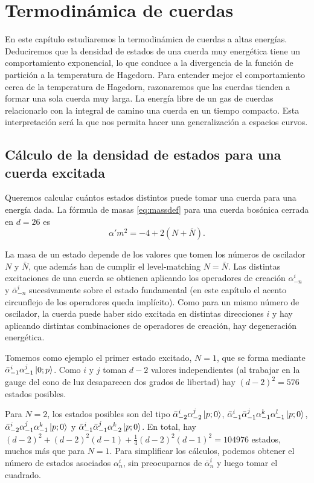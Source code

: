 \chapter{Termodinámica de cuerdas}

En este capítulo estudiaremos la termodinámica de cuerdas a altas energías.
Deduciremos que la densidad de estados de una cuerda muy energética tiene un comportamiento
exponencial, lo que conduce a la divergencia de la función de partición a la temperatura de 
Hagedorn.
Para entender mejor el comportamiento cerca de la temperatura de Hagedorn, razonaremos 
que las cuerdas tienden a formar una sola cuerda muy larga.
La energía libre de un gas de cuerdas relacionarlo con la integral de camino una cuerda
en un tiempo compacto.
Esta interpretación será la que nos permita hacer una generalización a espacios curvos.

\section{Cálculo de la densidad de estados para una cuerda excitada}

Queremos calcular cuántos estados distintos puede tomar una cuerda para una energía dada.
La fórmula de masas \ref{eq:massdef} para una cuerda bosónica cerrada en $d=26$ es 
\begin{equation}
  \alpha' m^2=-4+2(N+\bar N).
\end{equation}

La masa de un estado depende de los valores que tomen los números de oscilador $N$ y $\bar N$, que además
han de cumplir el level-matching $N=\bar N$.
Las distintas excitaciones de una cuerda se obtienen aplicando los operadores
de creación $\alpha^i_{-n}$ y $\bar \alpha^i_{-n}$ sucesivamente sobre el estado fundamental (en este
capítulo el acento circunflejo de los operadores queda implícito).
Como para un mismo número de oscilador, la cuerda puede haber sido excitada en distintas direcciones
$i$ y hay aplicando distintas combinaciones de operadores de creación, hay degeneración energética.

Tomemos como ejemplo el primer estado excitado, $N=1$, que se forma mediante $\bar \alpha^i_{-1} \alpha^j_{-1} \ket{0;p}$.
Como $i$ y $j$ toman $d-2$ valores independientes (al trabajar en la gauge del cono de luz desaparecen dos grados de libertad)
hay $(d-2)^2=576$ estados posibles.

Para $N=2$, los estados posibles son del tipo $\bar \alpha^i_{-2} \alpha^j_{-2}\ket{p;0}$, 
$\bar \alpha^i_{-1} \bar \alpha^j_{-1} \alpha^k_{-1} \alpha^l_{-1} \ket{p;0}$,
$\bar \alpha^i_{-2} \alpha^j_{-1} \alpha^k_{-1}\ket{p;0}$ y $\bar \alpha^i_{-1} \bar \alpha^j_{-1} \alpha^k_{-2} \ket{p;0}$.
En total, hay $(d-2)^2 + (d-2)^2(d-1) + \frac{1}{4}(d-2)^2(d-1)^2= 104976$ estados, muchos más que para $N=1$.
Para simplificar los cálculos, podemos obtener el número de estados asociados $\alpha^i_n$,
sin preocuparnos de $\bar \alpha^i_n$ y luego tomar el cuadrado.

